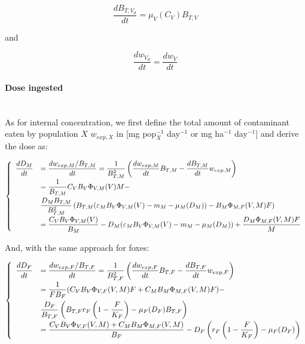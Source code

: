 \documentclass[11pt]{article}
\begin{document}
\begin{equation}
\dfrac{dB_{T,V_d}}{dt}  = \mu_V(C_V)B_{T,V}
\end{equation}

and

\begin{equation}
\dfrac{dw_{V_d}}{dt}  = \dfrac{dw_{V}}{dt}
\end{equation}
%


\paragraph{Dose ingested}~\\
As for internal concentration, we first define the total amount of contaminant eaten by population $X$ $w_{exp,X}$ in [mg pop$_X^{-1}$ day$^{-1}$ or mg ha$^{-1}$ day$^{-1}$] and derive the dose as:

\begin{equation}
\left\lbrace
\begin{array}{c  l}
\dfrac{dD_M}{dt} & =  \dfrac{d w_{exp,M} / B_{T,M}}{dt} = \dfrac{1}{B_{T,M}^2} \left(\dfrac{d w_{exp,M}}{dt} B_{T,M} - \dfrac{d B_{T,M}}{dt} w_{exp,M}\right)
\\[3mm]
%
& =  \dfrac{1}{B_{T,M}} C_V B_V \Phi_{V,M}(V)M - \\[3mm]
& \dfrac{D_M B_{T,M}}{B_{T,M}^2} \left( 	B_{T,M} (\varepsilon_MB_V  \Phi_{V,M}(V) - m_M - \mu_M(D_M) ) - B_M \Phi_{M,F}(V, M) F \right)	\\[3mm]
& =  \dfrac{C_V B_V \Phi_{V,M}(V)}{B_M} - D_M	(\varepsilon_MB_V  \Phi_{V,M}(V) - m_M - \mu_M(D_M) ) + \dfrac{D_M \Phi_{M,F}(V, M) F}{M}  	
\end{array}
\right.
\end{equation}


And, with the same approach for foxes:

\begin{equation}
\left\lbrace
\begin{array}{c  l}
\dfrac{dD_F}{dt} & =  \dfrac{d w_{exp,F} / B_{T,F}}{dt} = \dfrac{1}{B_{T,F}^2} \left(\dfrac{d w_{exp,F}}{dt} B_{T,F} - \dfrac{d B_{T,F}}{dt} w_{exp,F}\right)
\\[3mm]
%
& =  \dfrac{1}{F B_F} (C_V B_V \Phi_{V,F}(V,M)F + C_M B_M \Phi_{M,F}(V,M)F ) - \\[3mm]
& \dfrac{D_F }{B_{T,F}} \left( 	B_{T,F} r_F\left( 1- \dfrac{F}{K_F} \right)	- \mu_F(D_F) B_{T,F}\right)	\\[3mm]
& =  \dfrac{C_V B_V \Phi_{V,F}(V,M) + C_M B_M \Phi_{M,F}(V,M)}{B_F} -  D_F \left(r_F \left( 1- \dfrac{F}{K_F} \right)	- \mu_F(D_F)  \right)	
\end{array}
\right.
\end{equation}
\end{document}
